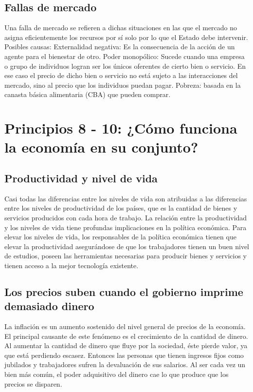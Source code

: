 \documentclass{report}
\begin{document}
\subsection{Fallas de mercado}
Una falla de mercado se refieren a dichas situaciones en las que el mercado no asigna eficientemente los recursos por sí solo por lo que el Estado debe intervenir.
Posibles causas:
Externalidad negativa: Es la consecuencia de la acción de un agente para el bienestar de otro.
Poder monopólico: Sucede cuando una empresa o grupo de individuos logran ser los únicos oferentes de cierto bien o servicio. En ese caso el precio de dicho bien o servicio no está sujeto a las interacciones del mercado, sino al precio que los individuos puedan pagar.
Pobreza: basada en la canasta básica alimentaria (CBA) que pueden comprar.

\section{Principios 8 - 10: ¿Cómo funciona la economía en su conjunto?}
\subsection{Productividad y nivel de vida}
Casi todas las diferencias entre los niveles de vida son atribuidas a las diferencias entre los niveles de productividad de los países, que es la cantidad de bienes y servicios producidos con cada hora de trabajo.
La relación entre la productividad y los niveles de vida tiene profundas implicaciones en la política económica. Para elevar los niveles de vida, los responsables de la política económica tienen que elevar la productividad asegurándose de que los trabajadores tienen un buen nivel de estudios, poseen las herramientas necesarias para producir bienes y servicios y tienen acceso a la mejor tecnología existente.


\subsection{Los precios suben cuando el gobierno imprime demasiado dinero}
La inflación es un aumento sostenido del nivel general de precios de la economía.
El principal causante de este fenómeno es el crecimiento de la cantidad de dinero. Al aumentar la cantidad de dinero que fluye por la sociedad, éste pierde valor, ya que está perdiendo escasez. Entonces las personas que tienen ingresos fijos como jubilados y trabajadores sufren la devaluación de sus salarios. Al ser cada vez un bien más común, el poder adquisitivo del dinero cae lo que produce que los precios se disparen. \\
\end{document}

